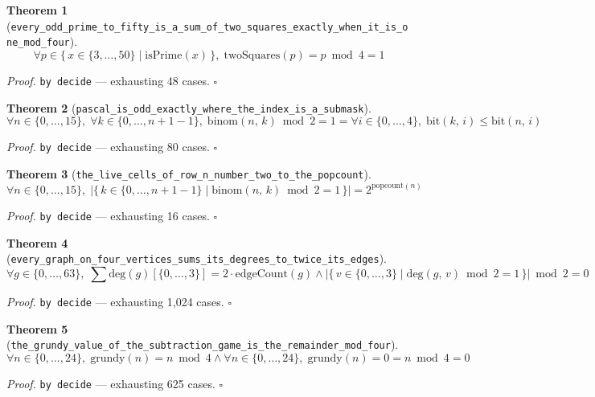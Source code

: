 \documentclass[11pt]{article}
\newtheorem{theorem}{Theorem}[section]
\begin{document}
\begin{theorem}[\texttt{every\_odd\_prime\_to\_fifty\_is\_a\_sum\_of\_two\_squares\_exactly\_when\_it\_is\_one\_mod\_four}]
\[ \forall p \in \{\, x \in \{3,\dots,50\} \mid \mathrm{isPrime}\mathopen{}\left(x\right) \,\},\; \mathrm{twoSquares}\mathopen{}\left(p\right) = p \bmod 4 = 1 \]
\end{theorem}
\noindent\emph{Proof.} \texttt{by decide} --- exhausting 48 cases. \hfill$\square$

\begin{theorem}[\texttt{pascal\_is\_odd\_exactly\_where\_the\_index\_is\_a\_submask}]
\[ \forall n \in \{0,\dots,15\},\; \forall k \in \{0,\dots,n + 1-1\},\; \mathrm{binom}\mathopen{}\left(n,\,k\right) \bmod 2 = 1 = \forall i \in \{0,\dots,4\},\; \mathrm{bit}\mathopen{}\left(k,\,i\right) \le \mathrm{bit}\mathopen{}\left(n,\,i\right) \]
\end{theorem}
\noindent\emph{Proof.} \texttt{by decide} --- exhausting 80 cases. \hfill$\square$

\begin{theorem}[\texttt{the\_live\_cells\_of\_row\_n\_number\_two\_to\_the\_popcount}]
\[ \forall n \in \{0,\dots,15\},\; \left|\{\, k \in \{0,\dots,n + 1-1\} \mid \mathrm{binom}\mathopen{}\left(n,\,k\right) \bmod 2 = 1 \,\}\right| = 2^{\mathrm{popcount}\mathopen{}\left(n\right)} \]
\end{theorem}
\noindent\emph{Proof.} \texttt{by decide} --- exhausting 16 cases. \hfill$\square$

\begin{theorem}[\texttt{every\_graph\_on\_four\_vertices\_sums\_its\_degrees\_to\_twice\_its\_edges}]
\[ \forall g \in \{0,\dots,63\},\; \sum \mathrm{deg}\mathopen{}\left(g\right)[\{0,\dots,3\}] = 2 \cdot \mathrm{edgeCount}\mathopen{}\left(g\right) \land \left|\{\, v \in \{0,\dots,3\} \mid \mathrm{deg}\mathopen{}\left(g,\,v\right) \bmod 2 = 1 \,\}\right| \bmod 2 = 0 \]
\end{theorem}
\noindent\emph{Proof.} \texttt{by decide} --- exhausting 1,024 cases. \hfill$\square$

\begin{theorem}[\texttt{the\_grundy\_value\_of\_the\_subtraction\_game\_is\_the\_remainder\_mod\_four}]
\[ \forall n \in \{0,\dots,24\},\; \mathrm{grundy}\mathopen{}\left(n\right) = n \bmod 4 \land \forall n \in \{0,\dots,24\},\; \mathrm{grundy}\mathopen{}\left(n\right) = 0 = n \bmod 4 = 0 \]
\end{theorem}
\noindent\emph{Proof.} \texttt{by decide} --- exhausting 625 cases. \hfill$\square$
\end{document}
